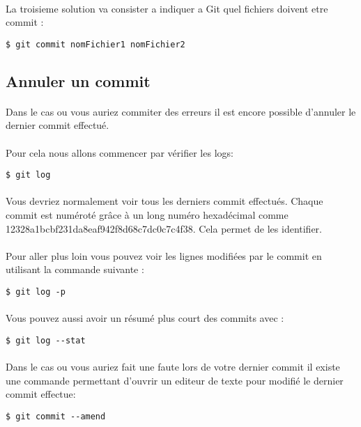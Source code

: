 \documentclass[french, a4paper, 12pt, titlepage]{article}
\begin{document}
\paragraph{}La troisieme solution va consister a indiquer a Git quel fichiers doivent etre commit :
\begin{lstlisting}
$ git commit nomFichier1 nomFichier2
\end{lstlisting}

\subsection{Annuler un commit}
\paragraph{}Dans le cas ou vous auriez commiter des erreurs il est encore possible d'annuler le dernier commit effectué.
\paragraph{}Pour cela nous allons commencer par vérifier les logs:
\begin{lstlisting}
$ git log
\end{lstlisting}
\paragraph{}Vous devriez normalement voir tous les derniers commit effectués. Chaque commit est numéroté grâce à un long numéro hexadécimal comme 12328a1bcbf231da8eaf942f8d68c7dc0c7c4f38. Cela permet de les identifier.
\paragraph{}Pour aller plus loin vous pouvez voir les lignes modifiées par le commit en utilisant la commande suivante :
\begin{lstlisting}
$ git log -p
\end{lstlisting}
\paragraph{}Vous pouvez aussi avoir un résumé plus court des commits avec :
\begin{lstlisting}
$ git log --stat
\end{lstlisting}

\paragraph{}Dans le cas ou vous auriez fait une faute lors de votre dernier commit il existe une commande permettant d'ouvrir un editeur de texte pour modifié le dernier commit effectue:
\begin{lstlisting}
$ git commit --amend
\end{lstlisting}
\end{document}
